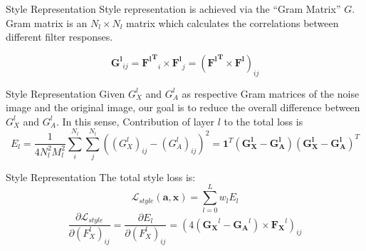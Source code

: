 \documentclass{beamer}
\begin{document}
\begin{frame}{Style Representation}
Style representation is achieved via the ``Gram Matrix'' $G$. Gram matrix is
an $N_l \times N_l$ matrix which calculates the correlations between
different filter responses.

\begin{equation}
    \mathbf{G^l}_{ij} = \mathbf{{F^l}^T}_i \times \mathbf{F^l}_j
    = (\mathbf{{F^l}^T} \times \mathbf{F^l})_{ij}
\end{equation}
\end{frame}

\begin{frame}{Style Representation}
Given $G_X^l$ and $G_A^l$ as respective Gram matrices of the
noise image and the original image, our goal is to reduce the overall
difference between $G_X^l$ and $G_A^l$. In this sense,
Contribution of layer $l$ to the total loss is
\begin{equation}
    E_l = \frac{1}{4N_l^2M_l^2} \sum_{i}^{N_l}\sum_{j}^{N_l}{((G^l_X)_{ij} - (G_A^l)_{ij})^2}
    = \mathbf{1}^T(\mathbf{G^l_X} - \mathbf{G^l_A})(\mathbf{G^l_X} - \mathbf{G^l_A})^T
\end{equation}
\end{frame}

\begin{frame}{Style Representation}
The total style loss is:
\begin{equation}
    \mathcal{L}_{style}(\mathbf{a}, \mathbf{x}) = \sum_{l=0}^L {w_l E_l }
\end{equation}
\begin{equation}
    \frac{\partial \mathcal{L}_{style}}{\partial (F_X^l)_{ij}} = \frac{\partial E_l}{\partial (F^l_X)_{ij}} =
    (4(\mathbf{G_X}^l - \mathbf{G_A}^l) \times \mathbf{F_X}^l)_{ij}
\end{equation}
\end{frame}
\end{document}
